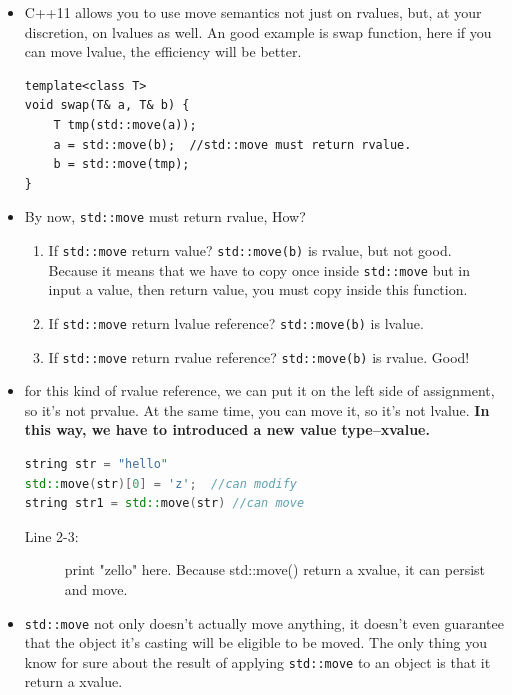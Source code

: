 \documentclass[a4paper,11pt,twoside]{book}
\begin{document}
\begin{itemize}
	\item C++11 allows you to use move semantics not just on rvalues, but, at your discretion, on lvalues as well. An good example is swap function, here if you can move lvalue, the efficiency will be better. 
	
\begin{lstlisting}[numbers=none]
template<class T> 
void swap(T& a, T& b) { 
	T tmp(std::move(a));
	a = std::move(b);  //std::move must return rvalue.
	b = std::move(tmp);
} 
\end{lstlisting}
	
	\item By now, \texttt{std::move} must return rvalue, How?
	\begin{enumerate}
		\item If \texttt{std::move} return  value? \texttt{std::move(b)} is rvalue, but not good. Because it means that we have to copy once inside \texttt{std::move} but in input a value, then return value, you must copy inside this function.
		
		\item If \texttt{std::move} return  lvalue reference? \texttt{std::move(b)} is lvalue. 
		
		\item If \texttt{std::move} return  rvalue reference? \texttt{std::move(b)} is rvalue. Good! 
	\end{enumerate} 

    \item for this kind of rvalue reference, we can put it on the left side of assignment, so it's not prvalue. At the same time, you can move it, so it's not lvalue.  \textbf{In this way, we have to introduced a new value type--xvalue.}    
\begin{lstlisting}[frame=single, language=c++, mathescape=true]
string str = "hello"
std::move(str)[0] = 'z';  //can modify
string str1 = std::move(str) //can move
\end{lstlisting}
\begin{description}
	\item[Line 2-3:] print "zello" here. Because std::move() return a xvalue, it can persist and move.
\end{description}
	
    \item  \texttt{std::move} not only doesn't actually move anything, it doesn't even guarantee that the object it's casting will be eligible to be moved. The only thing you know for sure about the result of applying \texttt{std::move} to an object is that it return a xvalue.


\end{itemize}
\end{document}

